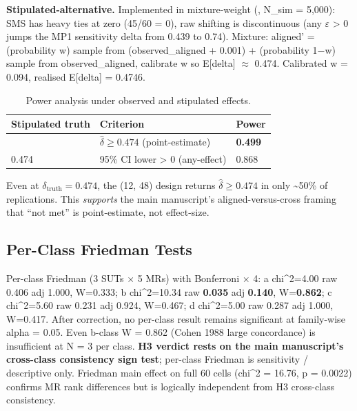 \documentclass[manuscript,screen,review]{acmart}
\begin{document}
\textbf{Stipulated-alternative.} Implemented in
mixture-weight (,
N\_sim = 5,000): SMS has heavy ties at zero (45/60 = 0), raw shifting is
discontinuous (any $\varepsilon$ \textgreater{} 0 jumps the MP1 sensitivity delta from 0.439 to 0.74).
Mixture: aligned' = (probability w) sample from (observed\_aligned +
0.001) + (probability 1$-$w) sample from observed\_aligned, calibrate w so
E{[}delta{]} $\approx$ 0.474. Calibrated w = 0.094, realised E{[}delta{]} =
0.4746.

{%
\begin{longtable}[]{@{}lll@{}}
\caption{Power analysis under observed and stipulated effects.}\label{tab:p2-24}\\
\toprule\noalign{}
Stipulated truth & Criterion & Power \\
\midrule\noalign{}
\endfirsthead
\endhead
\bottomrule\noalign{}
\endlastfoot
0.474 & $\hat{\delta} \geq 0.474$ (point-estimate) & \textbf{0.499} \\
0.474 & 95\% CI lower \textgreater{} 0 (any-effect) & 0.868 \\
\end{longtable}
}

Even at $\delta_{\mathrm{truth}} = 0.474$, the (12, 48) design returns $\hat{\delta} \geq
0.474$ in only \textasciitilde50\% of replications. This
\emph{supports} the main manuscript's aligned-versus-cross framing that ``not met'' is point-estimate, not
effect-size.

\subsection{Per-Class Friedman Tests}\label{d.4-friedman-per-class-discussion-of-small-n-concordance}

Per-class Friedman (3 SUTs $\times$ 5 MRs) with Bonferroni $\times$ 4: a chi\^{}2=4.00
raw 0.406 adj 1.000, W=0.333; b chi\^{}2=10.34 raw \textbf{0.035} adj
\textbf{0.140}, W=\textbf{0.862}; c chi\^{}2=5.60 raw 0.231 adj 0.924,
W=0.467; d chi\^{}2=5.00 raw 0.287 adj 1.000, W=0.417. After correction,
no per-class result remains significant at family-wise alpha = 0.05.
Even b-class W = 0.862 (Cohen 1988 large concordance) is insufficient at
N = 3 per class. \textbf{H3 verdict rests on the main manuscript's cross-class consistency sign test}; per-class
Friedman is sensitivity / descriptive only. Friedman main effect on full
60 cells (chi\^{}2 = 16.76, p = 0.0022) confirms MR rank differences but
is logically independent from H3 cross-class consistency.
\end{document}
